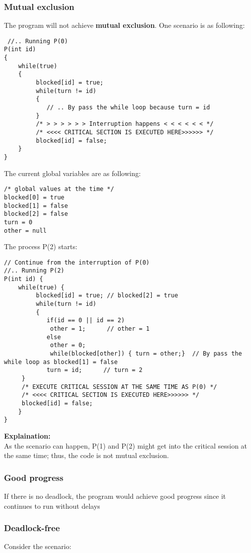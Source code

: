 \subsubsection{Mutual exclusion}
The program will not achieve \textbf{mutual exclusion}. One scenario is as following:

\begin{lstlisting}
 //.. Running P(0)
P(int id)
{
    while(true)
    {
         blocked[id] = true;
         while(turn != id)
         {
            // .. By pass the while loop because turn = id
         }
         /* > > > > > > Interruption happens < < < < < < */
         /* <<<< CRITICAL SECTION IS EXECUTED HERE>>>>>> */
         blocked[id] = false;
    }
}
\end{lstlisting}

The current global variables are as following:
\begin{lstlisting}
/* global values at the time */
blocked[0] = true
blocked[1] = false
blocked[2] = false
turn = 0
other = null
\end{lstlisting}

The process P(2) starts:
\begin{lstlisting}
// Continue from the interruption of P(0)
//.. Running P(2)
P(int id) {
    while(true) {
         blocked[id] = true; // blocked[2] = true
         while(turn != id)
         {
            if(id == 0 || id == 2)
             other = 1;      // other = 1
            else
             other = 0;      
             while(blocked[other]) { turn = other;}  // By pass the while loop as blocked[1] = false
            turn = id;      // turn = 2
     }
     /* EXECUTE CRITICAL SESSION AT THE SAME TIME AS P(0) */
     /* <<<< CRITICAL SECTION IS EXECUTED HERE>>>>>> */
     blocked[id] = false;
    }
}
\end{lstlisting}

\textbf{Explaination:} \\
As the scenario can happen, P(1) and P(2) might get into the critical session at the same time; thus, the code is not mutual exclusion.

\subsubsection{Good progress}
If there is no deadlock, the program would achieve good progress since it continues to run without delays

\newpage
\subsubsection{Deadlock-free}
Consider the scenario:

